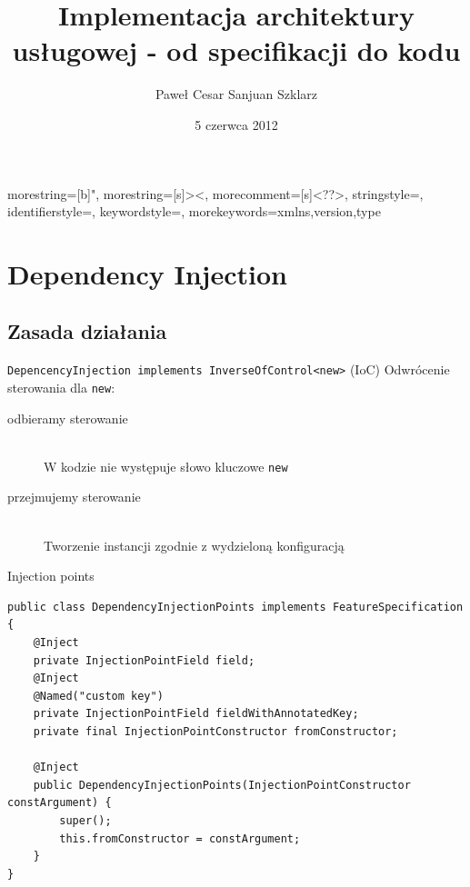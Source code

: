 \documentclass[smaller]{beamer}
\title[Implementacja architektury usługowej]{Implementacja architektury usługowej - od specifikacji do kodu}
\author{Paweł Cesar Sanjuan Szklarz}
\institute{Warszawa Java User Group}
\date{5 czerwca 2012}
\begin{document}
{
  morestring=[b]",
  morestring=[s]{>}{<},
  morecomment=[s]{<?}{?>},
  stringstyle=\color{black},
  identifierstyle=\color{darkblue},
  keywordstyle=\color{cyan},
  morekeywords={xmlns,version,type}%
}


\begin{frame}
\titlepage
\end{frame}


\begin{frame}
 \tableofcontents
\end{frame}

\section{Dependency Injection}
\subsection{Zasada działania}

\begin{frame}{\lstinline|DepencencyInjection implements InverseOfControl<new>|}
(IoC) Odwrócenie sterowania dla \lstinline|new|:
\begin{description}
 \item[odbieramy sterowanie] \hfill \\
 W kodzie nie występuje słowo kluczowe \lstinline|new|
 \item[przejmujemy sterowanie] \hfill \\
 Tworzenie instancji zgodnie z wydzieloną konfiguracją 
\end{description}
\end{frame}

\begin{frame}[fragile]{Injection points}
\begin{lstlisting}
public class DependencyInjectionPoints implements FeatureSpecification {
	@Inject
	private InjectionPointField field;
	@Inject
	@Named("custom key")
	private InjectionPointField fieldWithAnnotatedKey;
	private final InjectionPointConstructor fromConstructor;

	@Inject
	public DependencyInjectionPoints(InjectionPointConstructor constArgument) {
		super();
		this.fromConstructor = constArgument;
	}
}

\end{lstlisting}
% 
\end{frame}
\end{document}
